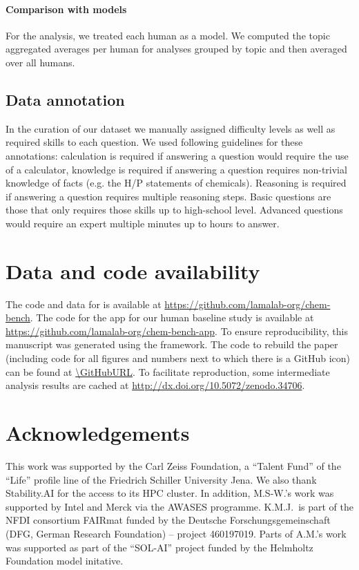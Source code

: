\documentclass[11pt, oneside]{article}
\begin{document}
\begin{refsection}
\paragraph{Comparison with models}
For the analysis, we treated each human as a model. We computed the topic aggregated averages per human for analyses grouped by topic and then averaged over all humans.

\subsection{Data annotation}\label{sec:meth-topic}
In the curation of our dataset we manually assigned difficulty levels as well as required skills to each question. We used following guidelines for these annotations: calculation is required if answering a question would require the use of a calculator, knowledge is required if answering a question requires non-trivial knowledge of facts (e.g. the H/P statements of chemicals). Reasoning is required if answering a question requires multiple reasoning steps.
Basic questions are those that only requires those skills up to high-school level. Advanced questions would require an expert multiple minutes up to hours to answer.

\section*{Data and code availability}
The code and data for \chembench is available at \url{https://github.com/lamalab-org/chem-bench}.
The code for the app for our human baseline study is available at \url{https://github.com/lamalab-org/chem-bench-app}.
To ensure reproducibility, this manuscript was generated using the \href{https://show-your.work/en/latest/}{\showyourwork} framework.\autocite{Luger2021}
The code to rebuild the paper (including code for all figures and numbers next to which there is a GitHub icon) can be found at \url{\GitHubURL}.
To facilitate reproduction, some intermediate analysis results are cached at \url{http://dx.doi.org/10.5072/zenodo.34706}.

\section*{Acknowledgements}
This work was supported by the Carl Zeiss Foundation, a \enquote{Talent Fund} of the \enquote{Life} profile line of the Friedrich Schiller University Jena.
We also thank Stability.AI for the access to its HPC cluster. In addition, M.S-W.'s work was supported by Intel and Merck via the AWASES programme.
K.M.J.\ is part of the NFDI consortium FAIRmat funded by the Deutsche Forschungsgemeinschaft (DFG, German Research Foundation) – project 460197019.
Parts of A.M.'s work was supported as part of the \enquote{SOL-AI} project funded by the Helmholtz Foundation model initative.


\end{refsection}
\end{document}
